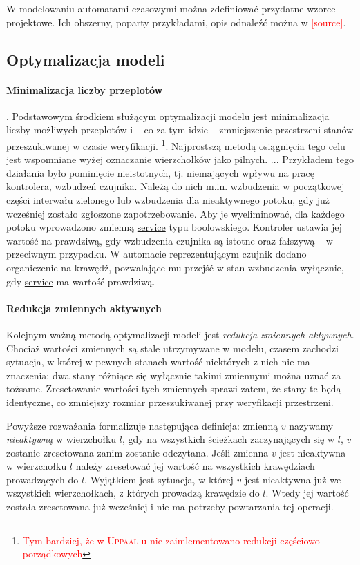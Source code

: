 \documentclass{pracamgr}
\newcommand{\todo}[1]{\textcolor{red}{#1}}
\newcommand{\todocite}{\todo{[source]}}
\newcommand{\upp}{\textsc{Uppaal}}
\theoremstyle{plain}
\begin{document}
W modelowaniu automatami czasowymi można zdefiniować przydatne wzorce
projektowe. Ich obszerny, poparty przykładami, opis odnaleźć można w
\todocite. 

\subsection{Optymalizacja modeli}
\label{s:models:opt}

\paragraph{Minimalizacja liczby przeplotów}. Podstawowym środkiem
służącym optymalizacji modelu jest minimalizacja liczby możliwych
przeplotów i -- co za tym idzie -- zmniejszenie przestrzeni stanów
przeszukiwanej w czasie weryfikacji. \footnote{\todo{Tym bardziej, że
    w \upp-u nie zaimlementowano redukcji częściowo
    porządkowych}}. Najprostszą metodą osiągnięcia tego celu jest
wspomniane wyżej oznaczanie wierzchołków jako pilnych.  ...
Przykładem tego działania było pominięcie nieistotnych,
tj. niemających wpływu na pracę kontrolera, wzbudzeń czujnika. Należą
do nich m.in. wzbudzenia w początkowej części interwału zielonego lub
wzbudzenia dla nieaktywnego potoku, gdy już wcześniej zostało
zgłoszone zapotrzebowanie. Aby je wyeliminować, dla każdego potoku
wprowadzono zmienną \url{service} typu boolowskiego. Kontroler ustawia
jej wartość na prawdziwą, gdy wzbudzenia czujnika są istotne oraz
fałszywą -- w przeciwnym przypadku. W automacie reprezentującym
czujnik dodano organiczenie na krawędź, pozwalające mu przejść w stan
wzbudzenia wyłącznie, gdy \url{service} ma wartość prawdziwą.

\paragraph{Redukcja zmiennych aktywnych} Kolejnym ważną metodą
optymalizacji modeli jest \emph{redukcja zmiennych aktywnych}.
Chociaż wartości zmiennych są stale utrzymywane w modelu, czasem
zachodzi sytuacja, w której w pewnych stanach wartość niektórych z
nich nie ma znaczenia: dwa stany różniące się wyłącznie takimi
zmiennymi można uznać za tożsame. Zresetowanie wartości tych zmiennych
sprawi zatem, że stany te będą identyczne, co zmniejszy rozmiar
przeszukiwanej przy weryfikacji przestrzeni.

Powyższe rozważania formalizuje następująca definicja: zmienną $v$
nazywamy \emph{nieaktywną} w wierzchołku $l$, gdy na wszystkich
ścieżkach zaczynających się w $l$, $v$ zostanie zresetowana zanim
zostanie odczytana. Jeśli zmienna $v$ jest nieaktywna w wierzchołku
$l$ należy zresetować jej wartość na wszystkich krawędziach
prowadzących do $l$. Wyjątkiem jest sytuacja, w której $v$ jest
nieaktywna już we wszystkich wierzchołkach, z których prowadzą
krawędzie do $l$. Wtedy jej wartość została zresetowana już wcześniej
i nie ma potrzeby powtarzania tej operacji.
\end{document}
